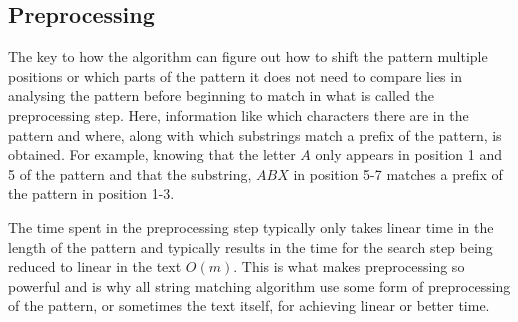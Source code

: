 \subsection{Preprocessing}
The key to how the algorithm can figure out how to shift the pattern multiple positions or which parts of the pattern it does not need to compare lies in analysing the pattern before beginning to match in what is called the preprocessing step. Here, information like which characters there are in the pattern and where, along with which substrings match a prefix of the pattern, is obtained. For example, knowing that the letter $A$ only appears in position 1 and 5 of the pattern and that the substring, $ABX$ in position 5-7 matches a prefix of the pattern in position 1-3. 

The time spent in the preprocessing step typically only takes linear time in the length of the pattern and typically results in the time for the search step being reduced to linear in the text $O(m)$. This is what makes preprocessing so powerful and is why all string matching algorithm use some form of preprocessing of the pattern, or sometimes the text itself, for achieving linear or better time. 

